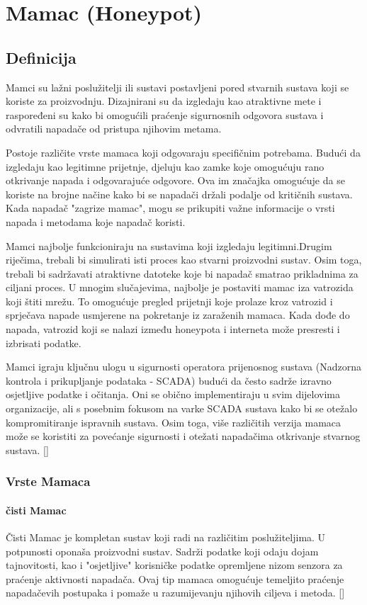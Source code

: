 \documentclass[times, utf8, zavrsni]{fer}
\begin{document}
\chapter{Mamac (Honeypot)}

\section{Definicija}
Mamci su lažni poslužitelji ili sustavi postavljeni pored stvarnih sustava koji se koriste za proizvodnju. Dizajnirani su da izgledaju kao atraktivne mete i raspoređeni su kako bi omogućili praćenje sigurnosnih odgovora sustava i odvratili napadače od pristupa njihovim metama.

Postoje različite vrste mamaca koji odgovaraju specifičnim potrebama. Budući da izgledaju kao legitimne prijetnje, djeluju kao zamke koje omogućuju rano otkrivanje napada i odgovarajuće odgovore. Ova im značajka omogućuje da se koriste na brojne načine kako bi se napadači držali podalje od kritičnih sustava. Kada napadač "zagrize mamac", mogu se prikupiti važne informacije o vrsti napada i metodama koje napadač koristi.

Mamci najbolje funkcioniraju na sustavima koji izgledaju legitimni.Drugim riječima, trebali bi simulirati isti proces kao stvarni proizvodni sustav. Osim toga, trebali bi sadržavati atraktivne datoteke koje bi napadač smatrao prikladnima za ciljani proces. U mnogim slučajevima, najbolje je postaviti mamac iza vatrozida koji štiti mrežu. To omogućuje pregled prijetnji koje prolaze kroz vatrozid i sprječava napade usmjerene na pokretanje iz zaraženih mamaca. Kada dođe do napada, vatrozid koji se nalazi između honeypota i interneta može presresti i izbrisati podatke.

Mamci igraju ključnu ulogu u sigurnosti operatora prijenosnog sustava (Nadzorna kontrola i prikupljanje podataka - SCADA) budući da često sadrže izravno osjetljive podatke i očitanja. Oni se obično implementiraju u svim dijelovima organizacije, ali s posebnim fokusom na varke SCADA sustava kako bi se otežalo kompromitiranje ispravnih sustava. Osim toga, više različitih verzija mamaca može se koristiti za povećanje sigurnosti i otežati napadačima otkrivanje stvarnog sustava.
 [\cite{honeypot-def}]
\subsection{Vrste Mamaca}
\subsubsection{čisti Mamac}
Čisti Mamac je kompletan sustav koji radi na različitim poslužiteljima. U potpunosti oponaša proizvodni sustav. Sadrži podatke koji odaju dojam tajnovitosti, kao i "osjetljive" korisničke podatke opremljene nizom senzora za praćenje aktivnosti napadača. Ovaj tip mamaca omogućuje temeljito praćenje napadačevih postupaka i pomaže u razumijevanju njihovih ciljeva i metoda. [\cite{honeypot-def}]
\end{document}
